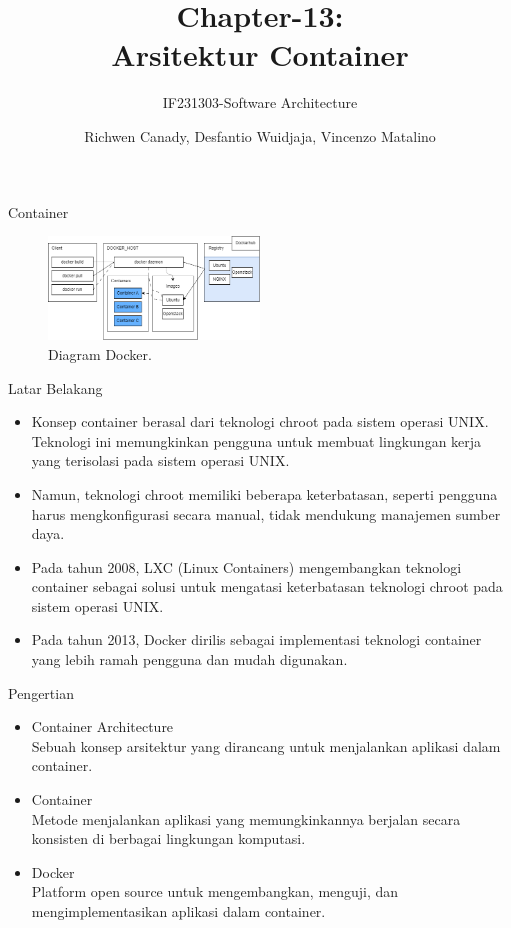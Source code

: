 \documentclass[aspectratio=169, table]{beamer}
\title{\huge Chapter-13:\\Arsitektur Container}
\subtitle{IF231303-Software Architecture}
\author{Richwen Canady, Desfantio Wuidjaja, Vincenzo Matalino}
\begin{document}
	\begin{frame}[plain]
		\maketitle
	\end{frame}

	\begin{frame}{Container}
		\begin{figure}[h]
			\centering
			\includegraphics[width=0.5\textwidth]{DockerDiagram.png}
			\caption{Diagram Docker.}
			\label{fig:ContainerDiagram}
		\end{figure}
	\end{frame}

	\begin{frame}{Latar Belakang}
		\begin{itemize}
			\item Konsep container berasal dari teknologi chroot pada sistem operasi UNIX. Teknologi ini memungkinkan pengguna untuk membuat lingkungan kerja yang terisolasi pada sistem operasi UNIX.
			\item Namun, teknologi chroot memiliki beberapa keterbatasan, seperti pengguna harus mengkonfigurasi secara manual, tidak mendukung manajemen sumber daya.
			\item Pada tahun 2008, LXC (Linux Containers) mengembangkan teknologi container sebagai solusi untuk mengatasi keterbatasan teknologi chroot pada sistem operasi UNIX.
			\item Pada tahun 2013, Docker dirilis sebagai implementasi teknologi container yang lebih ramah pengguna dan mudah digunakan.
		\end{itemize}
	\end{frame}

	\begin{frame}{Pengertian}
		\begin{itemize}
			\item Container Architecture
			\\Sebuah konsep arsitektur yang dirancang untuk menjalankan aplikasi dalam container.
			\item Container
			\\Metode menjalankan aplikasi yang memungkinkannya berjalan secara konsisten di berbagai lingkungan komputasi.
			\item Docker
			\\Platform open source untuk mengembangkan, menguji, dan mengimplementasikan aplikasi dalam container.
		\end{itemize}
	\end{frame}
\end{document}
